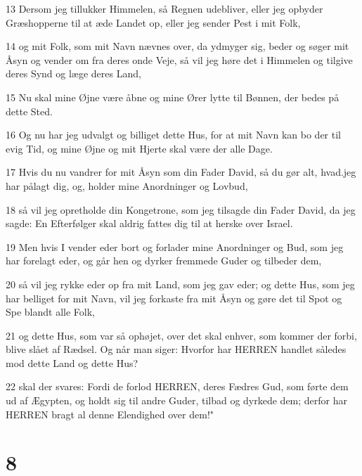 \par 13 Dersom jeg tillukker Himmelen, så Regnen udebliver, eller jeg opbyder Græshopperne til at æde Landet op, eller jeg sender Pest i mit Folk,
\par 14 og mit Folk, som mit Navn nævnes over, da ydmyger sig, beder og søger mit Åsyn og vender om fra deres onde Veje, så vil jeg høre det i Himmelen og tilgive deres Synd og læge deres Land,
\par 15 Nu skal mine Øjne være åbne og mine Ører lytte til Bønnen, der bedes på dette Sted.
\par 16 Og nu har jeg udvalgt og billiget dette Hus, for at mit Navn kan bo der til evig Tid, og mine Øjne og mit Hjerte skal være der alle Dage.
\par 17 Hvis du nu vandrer for mit Åsyn som din Fader David, så du gør alt, hvad.jeg har pålagt dig, og, holder mine Anordninger og Lovbud,
\par 18 så vil jeg opretholde din Kongetrone, som jeg tilsagde din Fader David, da jeg sagde: En Efterfølger skal aldrig fattes dig til at herske over Israel.
\par 19 Men hvis I vender eder bort og forlader mine Anordninger og Bud, som jeg har forelagt eder, og går hen og dyrker fremmede Guder og tilbeder dem,
\par 20 så vil jeg rykke eder op fra mit Land, som jeg gav eder; og dette Hus, som jeg har belliget for mit Navn, vil jeg forkaste fra mit Åsyn og gøre det til Spot og Spe blandt alle Folk,
\par 21 og dette Hus, som var så ophøjet, over det skal enhver, som kommer der forbi, blive slået af Rædsel. Og når man siger: Hvorfor har HERREN handlet således mod dette Land og dette Hus?
\par 22 skal der svares: Fordi de forlod HERREN, deres Fædres Gud, som førte dem ud af Ægypten, og holdt sig til andre Guder, tilbad og dyrkede dem; derfor har HERREN bragt al denne Elendighed over dem!"

\chapter{8}


